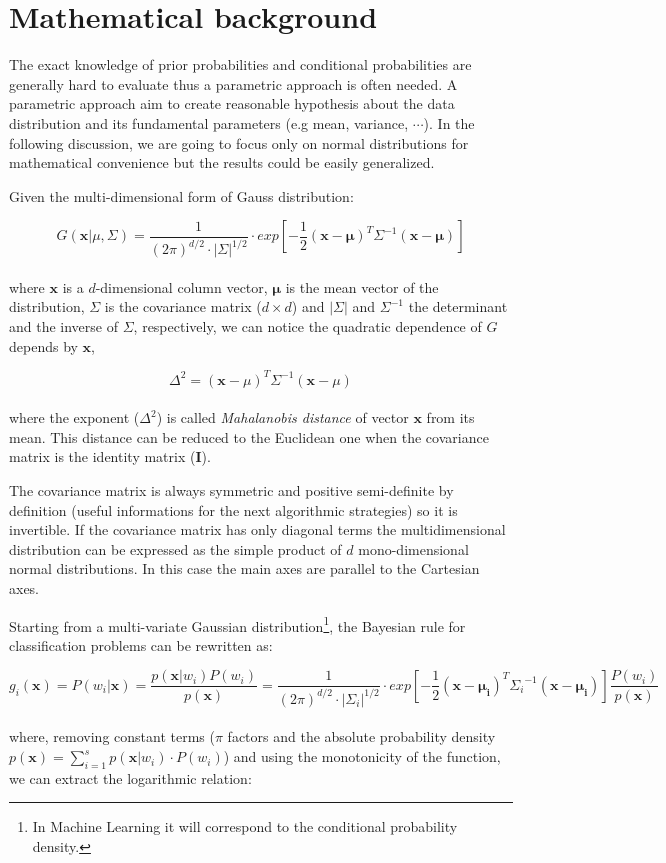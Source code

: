 \documentclass{standalone}
\begin{document}
\section*{Mathematical background}

The exact knowledge of prior probabilities and conditional probabilities are generally hard to evaluate thus a parametric approach is often needed.
A parametric approach aim to create reasonable hypothesis about the data distribution and its fundamental parameters (e.g mean, variance, $\cdots$).
In the following discussion, we are going to focus only on normal distributions for mathematical convenience but the results could be easily generalized.

Given the multi-dimensional form of Gauss distribution:

$$
G(\mathbf{x}|\mu, \Sigma) = \frac{1}{(2\pi)^{d/2}\cdot\left|\Sigma\right|^{1/2}}\cdot exp\left[-\frac{1}{2}(\mathbf{x}-\mathbf{\mu})^T\Sigma^{-1}(\mathbf{x}-\mathbf{\mu})\right]
$$
\\
where $\mathbf{x}$ is a $d$-dimensional column vector, $\mathbf{\mu}$ is the mean vector of the distribution, $\Sigma$ is the covariance matrix ($d\times d$) and $|\Sigma|$ and $\Sigma^{-1}$ the determinant and the inverse of $\Sigma$, respectively, we can notice the quadratic dependence of $G$ depends by $\mathbf{x}$,

$$
\Delta^2 = (\mathbf{x}-\mu)^T\Sigma^{-1}(\mathbf{x}-\mu)
$$
\\
where the exponent ($\Delta^2$) is called \emph{Mahalanobis distance} of vector $\mathbf{x}$ from its mean.
This distance can be reduced to the Euclidean one when the covariance matrix is the identity matrix ($\mathbf{I}$).

The covariance matrix is always symmetric and positive semi-definite by definition (useful informations for the next algorithmic strategies) so it is invertible.
If the covariance matrix has only diagonal terms the multidimensional distribution can be expressed as the simple product of $d$ mono-dimensional normal distributions.
In this case the main axes are parallel to the Cartesian axes.

Starting from a multi-variate Gaussian distribution\footnote{
  In Machine Learning it will correspond to the conditional probability density.
}, the Bayesian rule for classification problems can be rewritten as:

$$
g_i(\mathbf{x}) = P(w_i|\mathbf{x}) = \frac{p(\mathbf{x}|w_i)P(w_i)}{p(\mathbf{x})} = \frac{1}{(2\pi)^{d/2}\cdot\left|\Sigma_i\right|^{1/2}}\cdot exp\left[-\frac{1}{2}(\mathbf{x}-\mathbf{\mu_i})^T{\Sigma_i}^{-1}(\mathbf{x}-\mathbf{\mu_i})\right] \frac{P(w_i)}{p(\mathbf{x})}
$$
\\
where, removing constant terms ($\pi$ factors and the absolute probability density $p(\mathbf{x}) = \sum_{i=1}^s p(\mathbf{x}|w_i)\cdot P(w_i)$) and using the monotonicity of the function, we can extract the logarithmic relation:
\end{document}
